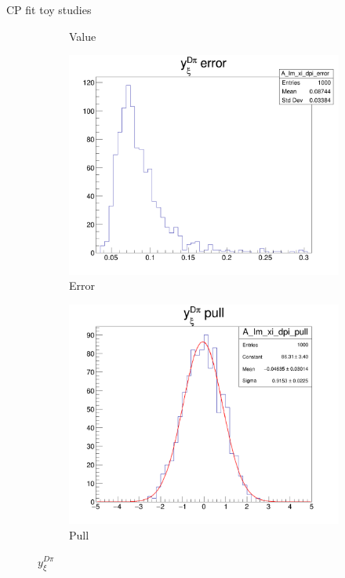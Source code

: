 \documentclass{beamer}
\begin{document}
\begin{frame}{CP fit toy studies}
\begin{figure}
\begin{subfigure}{0.25\textwidth}
      \caption{Value}
    \end{subfigure}%
    \begin{subfigure}{0.25\textwidth}
      \includegraphics[width = 1.0\textwidth]{Plots/A_Im_xi_dpi_error.png}
      \caption{Error}
    \end{subfigure}%
    \begin{subfigure}{0.25\textwidth}
      \includegraphics[width = 1.0\textwidth]{Plots/A_Im_xi_dpi_pull.png}
      \caption{Pull}
    \end{subfigure}
    \caption{$y_\xi^{D\pi}$}
  \end{figure}
\end{frame}
\end{document}
